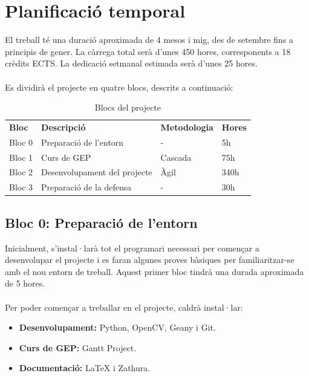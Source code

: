 \def\arraystretch{1.4}

\section{Planificació temporal}
	El treball té una duració aproximada de 4 mesos i mig, des de setembre fins a principis de gener. La càrrega total serà d'unes 450 hores, corresponents a 18 crèdits ECTS.
	La dedicació setmanal estimada serà d'unes 25 hores.\\\\
	Es dividirà el projecte en quatre blocs, descrits a continuació:\\

	\begin{table}[H]
		\begin{center}
			\begin{tabular}{l !{\vrule width -1pt}p{8cm} !{\vrule width -1pt}l !{\vrule width -1pt}l }
			\textbf{Bloc} & \textbf{Descripció} & \textbf{Metodologia} & \textbf{Hores} \\
			Bloc 0 & Preparació de l'entorn & - & 5h \\
			Bloc 1 & Curs de GEP & Cascada & 75h \\
			Bloc 2 & Desenvolupament del projecte & Àgil & 340h \\
			Bloc 3 & Preparació de la defensa & - & 30h \\
			\end{tabular}
		\end{center}
		\caption{Blocs del projecte}
	\end{table}

	\subsection{Bloc 0: Preparació de l'entorn}
		Inicialment, s'instal·larà tot el programari necessari per començar a desenvolupar el projecte i es faran algunes proves bàsiques per familiaritzar-se amb el nou entorn de treball.
		Aquest primer bloc tindrà una durada aproximada de 5 hores.\\\\
		Per poder començar a treballar en el projecte, caldrà instal·lar:\\
		\begin{itemize}
			\item \textbf{Desenvolupament:} Python, OpenCV, Geany i Git.
			\item \textbf{Curs de GEP:} Gantt Project.
			\item \textbf{Documentació:} {\LaTeX} i Zathura.
		\end{itemize}

